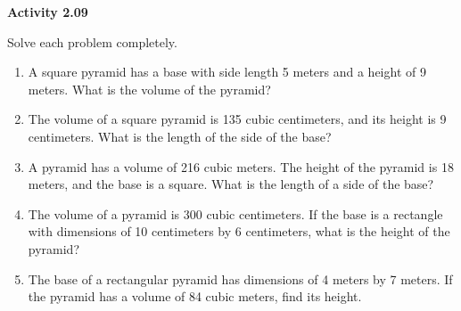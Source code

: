 \vspace{0.3ex}
\noindent\textbf{Activity 2.09}

\vspace{0.2ex}

Solve each problem completely.

\begin{enumerate}[noitemsep, label = \color{blue}\arabic*. ]
    \item A square pyramid has a base with side length 5 meters and a height of 9 meters. What is the volume of the pyramid?
    \item The volume of a square pyramid is 135 cubic centimeters, and its height is 9 centimeters. What is the length of the side of the base?
    \item A pyramid has a volume of 216 cubic meters. The height of the pyramid is 18 meters, and the base is a square. What is the length of a side of the base?
    \item The volume of a pyramid is 300 cubic centimeters. If the base is a rectangle with dimensions of 10 centimeters by 6 centimeters, what is the height of the pyramid?
    \item The base of a rectangular pyramid has dimensions of 4 meters by 7 meters. If the pyramid has a volume of 84 cubic meters, find its height.
\end{enumerate}

